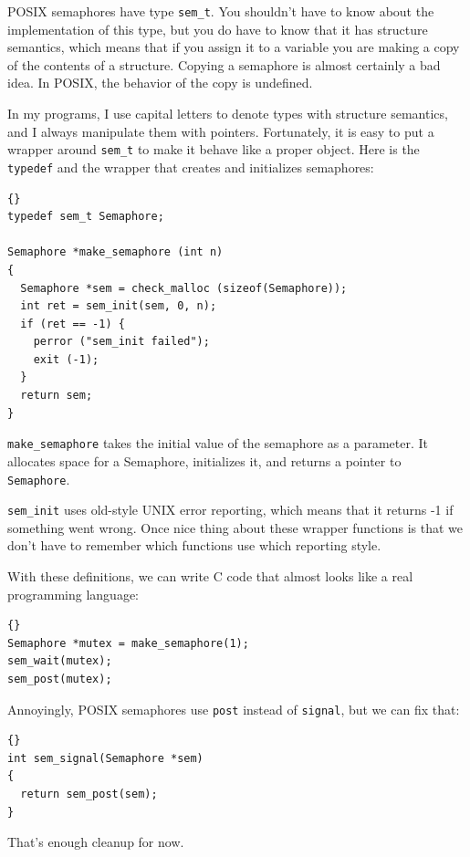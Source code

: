 \documentclass{book}
\begin{document}
POSIX semaphores have type {\tt sem\_t}.  You shouldn't have
to know about the implementation of this type, but you do
have to know that it has structure semantics, which means that
if you assign it to a variable you are making a copy of the
contents of a structure.  Copying a semaphore is almost certainly
a bad idea.  In POSIX, the behavior of the copy is undefined.

In my programs, I use capital letters to denote types with
structure semantics, and I always manipulate them with pointers.
Fortunately, it is easy to put a wrapper around {\tt sem\_t}
to make it behave like a proper object.  Here is the 
{\tt typedef} and the wrapper that creates and initializes
semaphores:

\begin{lstlisting}[caption={}]{}
typedef sem_t Semaphore;

Semaphore *make_semaphore (int n)
{
  Semaphore *sem = check_malloc (sizeof(Semaphore));
  int ret = sem_init(sem, 0, n);
  if (ret == -1) {
    perror ("sem_init failed");
    exit (-1);    
  }
  return sem;
}
\end{lstlisting}

{\tt make\_semaphore} takes the initial value of the semaphore
as a parameter.  It allocates space for a Semaphore, initializes
it, and returns a pointer to {\tt Semaphore}.

{\tt sem\_init} uses old-style UNIX error reporting, which means
that it returns -1 if something went wrong.  Once nice thing
about these wrapper functions is that we don't have to remember
which functions use which reporting style.

With these definitions, we can write C code that almost looks
like a real programming language:

\begin{lstlisting}[caption={}]{}
Semaphore *mutex = make_semaphore(1);
sem_wait(mutex);
sem_post(mutex);
\end{lstlisting}

Annoyingly, POSIX semaphores use {\tt post} instead of
{\tt signal}, but we can fix that:

\begin{lstlisting}[caption={}]{}
int sem_signal(Semaphore *sem)
{
  return sem_post(sem);
}
\end{lstlisting}

That's enough cleanup for now.
\end{document}
